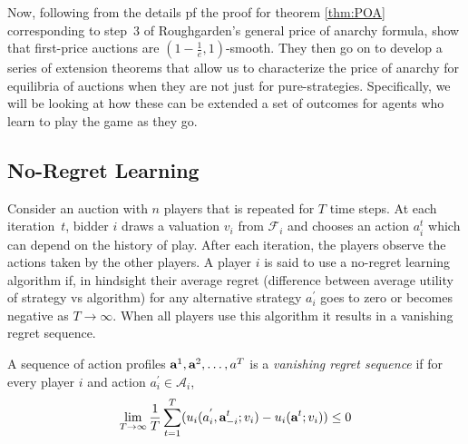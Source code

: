 \documentclass[12pt,twoside]{reedthesis}
\begin{document}
Now, following from the details pf the proof for theorem \ref{thm:POA} corresponding to step~3 of Roughgarden's general price of anarchy formula, \cite{Roughgarden2017} show that first-price auctions are $(1-\frac{1}{e}, 1)$-smooth. They then go on to develop a series of extension theorems that allow us to characterize the price of anarchy for equilibria of auctions when they are not just for pure-strategies. Specifically, we will be looking at how these can be extended a set of outcomes for agents who learn to play the game as they go.



\subsection{No-Regret Learning}
Consider an auction with $n$ players that is repeated for $T$ time steps. At each iteration~$t$, bidder $i$ draws a valuation $v_i$ from $\mathcal{F}_i$ and chooses an action $a_i^t$ which can depend on the history of play. After each iteration, the players observe the actions taken by the other players. 
A player $i$ is said to use a no-regret learning algorithm if, in hindsight their average regret (difference between average utility of strategy vs algorithm) for any alternative strategy $a_i^{'}$ goes to zero or becomes negative as $T \rightarrow \infty$. When all players use this algorithm it results in a vanishing regret sequence.

\begin{dfn}
	A sequence of action profiles $\textbf{a}^1 , \textbf{a}^2, \ldots, a^T$ is a \textit{vanishing regret sequence} if for every player $i$ and action $a_i^{'} \in \mathcal{A}_i$,
	$$ \lim\limits_{T \rightarrow \infty} \frac{1}{T} \sum_{t=1}^{T}(u_i(a_i^{'}, \textbf{a}_{-i}^{t};v_i) - u_i(\textbf{a}^t; v_i)) \leq 0$$
	\label{dfn:noregret} 
\end{dfn}
\end{document}

